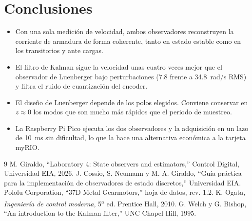 \documentclass[conference,a4paper]{IEEEtran}
\begin{document}
\section{Conclusiones}
\begin{itemize}
\item Con una sola medición de velocidad, ambos observadores reconstruyen la corriente de armadura de forma coherente, tanto en estado estable como en los transitorios y ante cargas.
\item El filtro de Kalman sigue la velocidad unas cuatro veces mejor que el observador de Luenberger bajo perturbaciones (7.8 frente a \SI{34.8}{rad/s} RMS) y filtra el ruido de cuantización del encoder.
\item El diseño de Luenberger depende de los polos elegidos. Conviene conservar en $z\approx0$ los modos que son mucho más rápidos que el periodo de muestreo.
\item La Raspberry Pi Pico ejecuta los dos observadores y la adquisición en un lazo de \SI{10}{ms} sin dificultad, lo que la hace una alternativa económica a la tarjeta myRIO.
\end{itemize}

\begin{thebibliography}{9}
 M. Giraldo, ``Laboratory 4: State observers and estimators,'' Control Digital, Universidad EIA, 2026.
 J. Cossio, S. Neumann y M. A. Giraldo, ``Guía práctica para la implementación de observadores de estado discretos,'' Universidad EIA.
 Pololu Corporation, ``37D Metal Gearmotors,'' hoja de datos, rev. 1.2.
 K. Ogata, \emph{Ingeniería de control moderna}, 5\textsuperscript{a} ed. Prentice Hall, 2010.
 G. Welch y G. Bishop, ``An introduction to the Kalman filter,'' UNC Chapel Hill, 1995.
\end{thebibliography}
\end{document}
